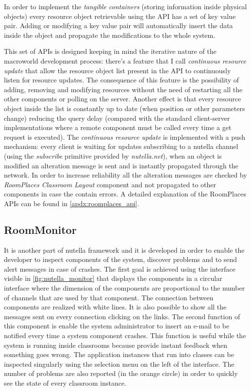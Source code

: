 In order to implement the \textit{tangible containers} (storing information inside physical objects) every resource object retrievable using the API has a set of key value pair. Adding or modifying a key value pair will automatically insert the data inside the object and propagate the modifications to the whole system.

This set of APIs is designed keeping in mind the iterative nature of the macroworld development process: there's a feature that I call \textit{continuous resource update} that allow the resource object list present in the API to continuously listen for resource updates. The consequence of this feature is the possibility of adding, removing and modifying resources without the need of restarting all the other components or polling on the server. Another effect is that every resource object inside the list is constantly up to date (when position or other parameters change) reducing the query delay (compared with the standard client-server implementations where a remote component must be called every time a get request is executed). The \textit{continuous resource update} is implemented with a push mechanism: every client is waiting for updates subscribing to a nutella channel (using the \textit{subscribe} primitive provided by \textit{nutella.net}), when an object is modified an alteration message is sent and is instantly propagated through the network. In order to increase reliability all the alteration messages are checked by \textit{RoomPlaces Classroom Layout} component and not propagated to other components in case the contain errors. A detailed explanation of the RoomPlaces APIs can be found in \autoref{apdx:roomplaces_api}.

\subsection{RoomMonitor}
It is another part of nutella framework and it is developed in order to enable the developer to inspect components of the system, discover problems and to send alert messages in case of crashes. The first goal is achieved using the interface visible in \ref{fig:nutella_monitor} that displays the components in a circular interface where the dimension of the components are proportional to the number of channels that are used by that component. The connection between components are realized with white lines. It is also possible to show all the messages sent on every connection clicking on the links. The second function of this component is enable the system administrator to insert an e-mail to be notified every time a system component crashes. This function is useful while the system is running inside classrooms because provide instant feedback when something goes wrong. The application instances that run into classes can be inspected singularly using the selection menu on the left of the interface. The number of problems are also reported (in the orange circle) in order to quickly see the state of every classroom instance.

